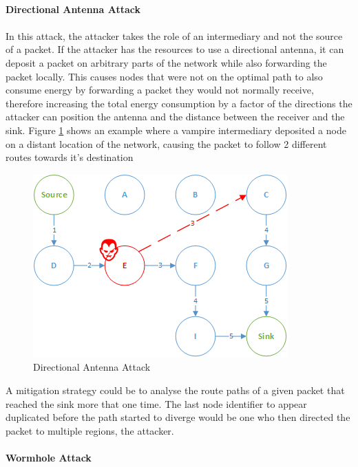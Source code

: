 \paragraph{\textbf{Directional Antenna Attack}}
\paragraph{}
In this attack, the attacker takes the role of an intermediary and not the source of a packet. If the attacker has the resources to use a directional antenna, it can deposit a packet on arbitrary parts of the network while also forwarding the packet locally. This causes nodes that were not on the optimal path to also consume energy by forwarding a packet they would not normally receive, therefore increasing the total energy consumption by a factor of the directions the attacker can position the antenna and the distance between the receiver and the sink. Figure \ref{fig:directional_antenna_attack} shows an example where a vampire intermediary deposited a node on a distant location of the network, causing the packet to follow 2 different routes towards it's destination

\begin{figure}[h]
  \centering
  \includegraphics[width=0.8\linewidth]{figures/Directional_Antenna_Attack.png}
  \caption{Directional Antenna Attack}
  \label{fig:directional_antenna_attack}
\end{figure}

A mitigation strategy could be to analyse the route paths of a given packet that reached the sink more that one time. The last node identifier to appear duplicated before the path started to diverge would be one who then directed the packet to multiple regions, the attacker.

\paragraph{\textbf{Wormhole Attack}}
